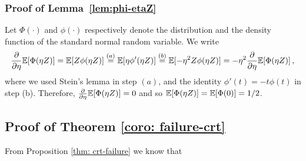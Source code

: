 \documentclass[11pt]{article}
\begin{document}
\subsubsection{Proof of Lemma~\ref{lem:phi-etaZ}}
Let $\Phi(\cdot)$ and $\phi(\cdot)$ respectively denote the distribution and the density function of the standard normal random variable. We write
\begin{align}
\frac{\partial}{\partial \eta} {\mathbb E}[\Phi(\eta Z)] = {\mathbb E}[Z \phi(\eta Z)]
\stackrel{(a)}{=} {\mathbb E}[\eta \phi'(\eta Z)] \stackrel{(b)}{=} {\mathbb E}[-\eta^2 Z \phi(\eta Z)] = -\eta^2  \frac{\partial}{\partial \eta} {\mathbb E}[\Phi(\eta Z)]\,, 
\end{align}
where we used Stein's lemma in step $(a)$, and the identity $\phi'(t) = -t\phi(t)$ in step (b). Therefore, $\frac{\partial}{\partial \eta} {\mathbb E}[\Phi(\eta Z)] = 0$ and so $ {\mathbb E}[\Phi(\eta Z)] =  {\mathbb E}[\Phi(0)] = 1/2$.

\subsection{Proof of Theorem \ref{coro: failure-crt}}\label{proof:coro: failure-crt}
From Proposition \ref{thm: crt-failure} we know that
\end{document}
